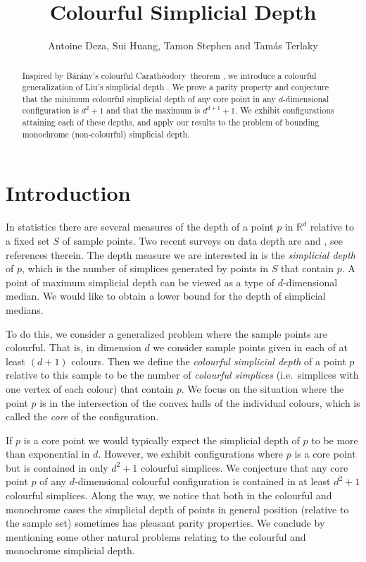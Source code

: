 \documentclass[epsbox,12pt,reqno]{amsart}
\title{Colourful Simplicial Depth}
\author{Antoine Deza, Sui Huang, Tamon Stephen and Tam{\' a}s Terlaky}
\theoremstyle{definition}
\theoremstyle{remark}
\def\bara{B\'ar\'any}
\def\cara{Carath\'eodory}
\def\R{\mathbb{R}}
\begin{document}
\def\minus{-}
\setcounter{page}{1}

\maketitle

\begin{abstract}
Inspired by \bara's colourful \cara~theorem \cite{Bar82}, we introduce
a colourful generalization of Liu's simplicial depth \cite{Liu90}.
We prove a parity property and conjecture that the minimum
colourful simplicial depth of any core point in any $d$-dimensional
configuration is $d^2+1$ and that the maximum is $d^{d+1}+1$.  
We exhibit configurations attaining each of these depths,
and apply our results to the problem of bounding
monochrome (non-colourful) simplicial depth.
\end{abstract}

%
%
\section{Introduction}\label{se:intro}

In statistics there are several measures of the depth of a
point $p$ in ${\R}^d$ relative to a fixed set $S$ of sample points. 
Two recent surveys on data depth are \cite{Alo05} and \cite{FR05},
see references therein.  
The depth measure we are interested in is the {\it simplicial depth} 
of $p$, which is the number of simplices generated by points
in $S$ that contain $p$.
A point of maximum simplicial depth can be viewed as a type of
$d$-dimensional median.  We would like to obtain a lower bound for 
the depth of simplicial medians.

To do this, we consider a generalized
problem where the sample points are colourful.  That is, in
dimension $d$ we consider sample points given in each of at least
$(d+1)$ colours.  Then we define the {\it colourful simplicial depth} of a
point $p$ relative to this sample to be the number of {\it colourful
simplices} (i.e.~simplices with one vertex of each colour) that
contain $p$.  We focus on the situation where the point $p$ is
in the intersection of the convex hulls of the individual colours,
which is called the {\it core} of the configuration.

If $p$ is a core point we would typically
expect the simplicial depth of $p$ to be more than exponential
in $d$.  However, we exhibit configurations where $p$ is a core point
but is contained in only $d^2+1$ colourful simplices.  We
conjecture that any core point $p$ of any $d$-dimensional 
colourful configuration is contained in at least $d^2+1$ 
colourful simplices.  
Along the way, we notice that both in the colourful and 
monochrome cases the simplicial depth of points in general position
(relative to the sample set) sometimes has pleasant parity properties.
We conclude by mentioning some other natural %
problems relating to the colourful
and monochrome simplicial depth.
\end{document}
